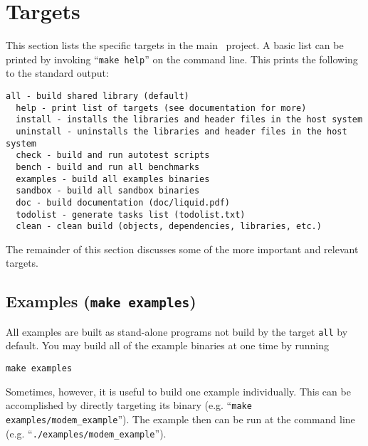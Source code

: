 
\section{Targets}
\label{section:installation:targets}
This section lists the specific targets in the main \liquid\ project.
A basic list can be printed by invoking ``{\tt make help}'' on the
command line.
This prints the following to the standard output:
%
\begin{Verbatim}[fontsize=\small]
  all - build shared library (default)
  help - print list of targets (see documentation for more)
  install - installs the libraries and header files in the host system
  uninstall - uninstalls the libraries and header files in the host system
  check - build and run autotest scripts
  bench - build and run all benchmarks
  examples - build all examples binaries
  sandbox - build all sandbox binaries
  doc - build documentation (doc/liquid.pdf)
  todolist - generate tasks list (todolist.txt)
  clean - clean build (objects, dependencies, libraries, etc.)
\end{Verbatim}
%
The remainder of this section discusses some of the more important and
relevant targets.


\subsection{Examples ({\tt make examples})}
\label{section:installation:targets:examples}
All examples are built as stand-alone programs not build by the target
{\tt all} by default.
You may build all of the example binaries at one time by running
%
\begin{Verbatim}[fontsize=\small]
    make examples
\end{Verbatim}
%
Sometimes, however, it is useful to build one example individually.
This can be accomplished by directly targeting its binary
(e.g. ``{\tt make examples/modem\_example}'').
The example then can be run at the command line
(e.g. ``{\tt ./examples/modem\_example}'').

